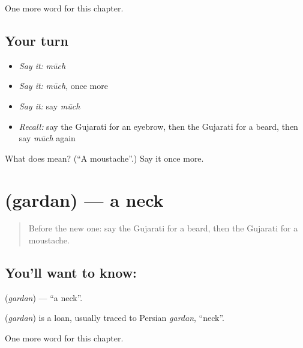 \begin{grammarlens}[title={What you've built}]
One more word for this chapter.
\end{grammarlens}

\subsection*{Your turn}
\begin{itemize}
\raggedright
  \item \emph{Say it:} \emph{mūch}
  \item \emph{Say it:} \emph{mūch}, once more
  \item \emph{Say it:} say \emph{mūch}
  \item \emph{Recall:} say the Gujarati for an eyebrow, then the Gujarati for a beard, then say \emph{mūch} again
\end{itemize}

\begin{tcolorbox}[breakable,colback=teal!4,colframe=teal!35!black,title={Before you move on}]
What does  mean? (\textquotedblleft{}A moustache\textquotedblright{}.) Say it once more.
\end{tcolorbox}
\section[\texorpdfstring{\gu{ગરદન} (gardan)}{ગરદન (gardan)}]{ (gardan) — a neck}

\label{lesson:GU-C125-gardan}



\begin{quote}
Before the new one: say the Gujarati for a beard, then the Gujarati for a moustache.
\end{quote}

\subsection*{You'll want to know: }
\textbf{} (\emph{gardan}) — \textquotedblleft{}a neck\textquotedblright{}.

\begin{cousinweb}
\textbf{} (\emph{gardan}) is a loan, usually traced to Persian \emph{gardan}, \textquotedblleft{}neck\textquotedblright{}.
\end{cousinweb}

\begin{grammarlens}[title={What you've built}]
One more word for this chapter.
\end{grammarlens}

